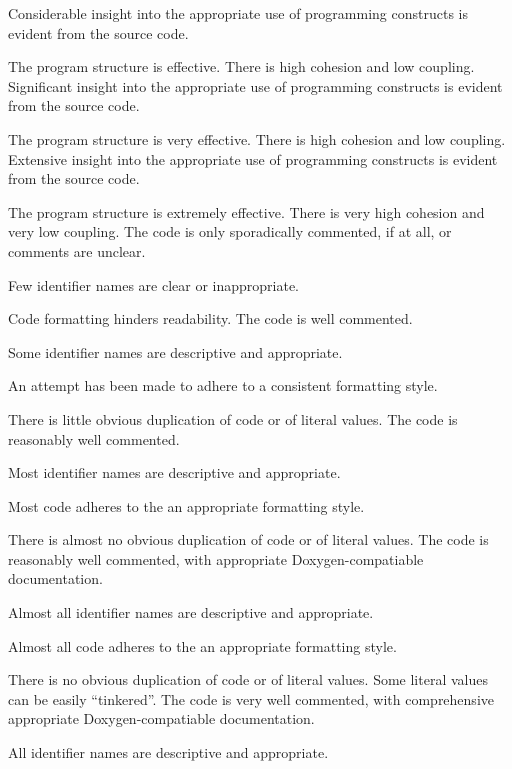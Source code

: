 \documentclass{../fal_assignment}
\begin{document}
\begin{markingrubric}
        \grade Considerable insight into the appropriate use of programming constructs is evident from the source code.
            \par The program structure is effective. There is high cohesion and low coupling.
        \grade Significant insight into the appropriate use of programming constructs is evident from the source code.
            \par The program structure is very effective. There is high cohesion and low coupling.
        \grade Extensive insight into the appropriate use of programming constructs is evident from the source code.
            \par The program structure is extremely effective. There is very high cohesion and very low coupling.
%
        \grade \fail The code is only sporadically commented, if at all, or comments are unclear.
            \par Few identifier names are clear or inappropriate.
            \par Code formatting hinders readability.
        \grade The code is well commented.
            \par Some identifier names are descriptive and appropriate.
            \par An attempt has been made to adhere to a consistent formatting style.
             \par There is little obvious duplication of code or of literal values.           
        \grade The code is reasonably well commented.
            \par Most identifier names are descriptive and appropriate.
            \par Most code adheres to the an appropriate formatting style.
             \par There is almost no obvious duplication of code or of literal values.   
        \grade The code is reasonably well commented, with appropriate Doxygen-compatiable documentation.
            \par Almost all identifier names are descriptive and appropriate.
            \par Almost all code adheres to the an appropriate formatting style.
             \par There is no obvious duplication of code or of literal values. Some literal values can be easily ``tinkered''. 
        \grade The code is very well commented, with comprehensive appropriate Doxygen-compatiable documentation.
            \par All identifier names are descriptive and appropriate.

\end{markingrubric}
\end{document}
